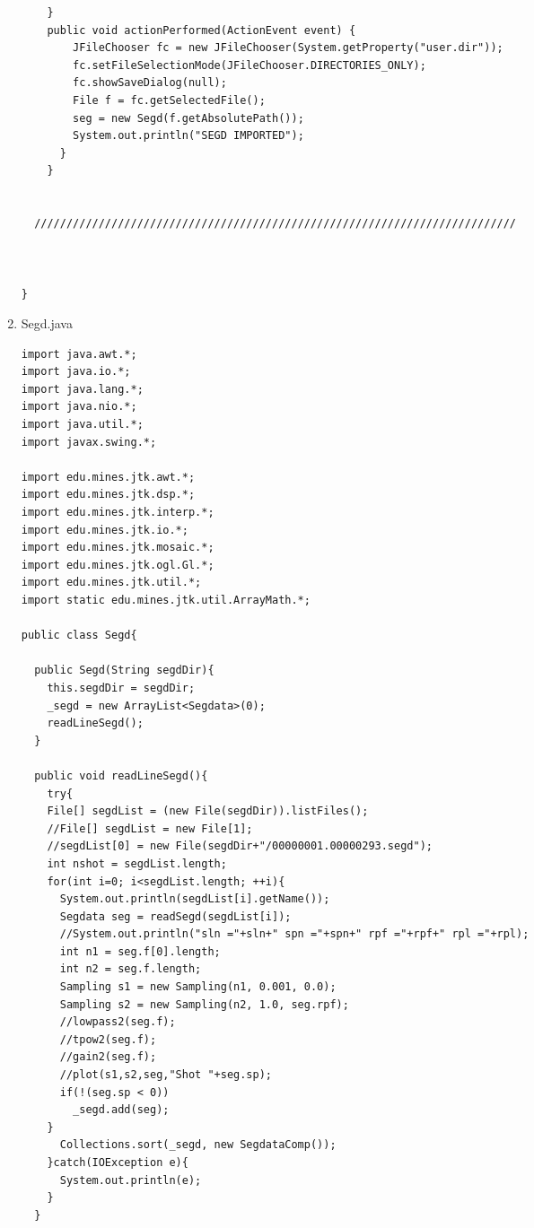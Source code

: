 \documentclass[11pt]{article}
\begin{document}
\begin{enumerate}
\begin{lstlisting}
    }
    public void actionPerformed(ActionEvent event) {
        JFileChooser fc = new JFileChooser(System.getProperty("user.dir"));
        fc.setFileSelectionMode(JFileChooser.DIRECTORIES_ONLY);
        fc.showSaveDialog(null);
        File f = fc.getSelectedFile();
        seg = new Segd(f.getAbsolutePath());
        System.out.println("SEGD IMPORTED");
      } 
    }


  ///////////////////////////////////////////////////////////////////////////



}
\end{lstlisting}

\item Segd.java
\begin{lstlisting}
import java.awt.*;
import java.io.*;
import java.lang.*;
import java.nio.*;
import java.util.*;
import javax.swing.*;

import edu.mines.jtk.awt.*;
import edu.mines.jtk.dsp.*;
import edu.mines.jtk.interp.*;
import edu.mines.jtk.io.*;
import edu.mines.jtk.mosaic.*;
import edu.mines.jtk.ogl.Gl.*;
import edu.mines.jtk.util.*;
import static edu.mines.jtk.util.ArrayMath.*;

public class Segd{

  public Segd(String segdDir){
    this.segdDir = segdDir;
    _segd = new ArrayList<Segdata>(0);
    readLineSegd();
  }

  public void readLineSegd(){
    try{
    File[] segdList = (new File(segdDir)).listFiles();
    //File[] segdList = new File[1];
    //segdList[0] = new File(segdDir+"/00000001.00000293.segd");
    int nshot = segdList.length; 
    for(int i=0; i<segdList.length; ++i){
      System.out.println(segdList[i].getName());
      Segdata seg = readSegd(segdList[i]);
      //System.out.println("sln ="+sln+" spn ="+spn+" rpf ="+rpf+" rpl ="+rpl);
      int n1 = seg.f[0].length;
      int n2 = seg.f.length;
      Sampling s1 = new Sampling(n1, 0.001, 0.0);
      Sampling s2 = new Sampling(n2, 1.0, seg.rpf);
      //lowpass2(seg.f);
      //tpow2(seg.f);
      //gain2(seg.f);
      //plot(s1,s2,seg,"Shot "+seg.sp);
      if(!(seg.sp < 0))
        _segd.add(seg);
    }
      Collections.sort(_segd, new SegdataComp());
    }catch(IOException e){
      System.out.println(e);
    }
  }


\end{lstlisting}
\end{enumerate}
\end{document}

